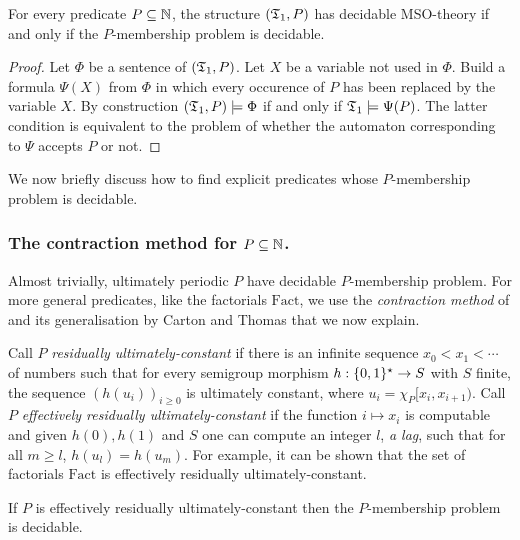 \begin{lemma} \cite{ElRa66}
For every predicate $P \subseteq \mathbb{N}$, the structure $(\mathfrak{T}_1,P)$ has decidable
MSO-theory if and only if the $P$-membership problem is decidable.
\end{lemma}

\begin{proof}
Let $\Phi$ be a sentence of $(\mathfrak{T}_1,P)$. Let $X$ be a
variable not used in $\Phi$.  Build a formula $\Psi(X)$ from $\Phi$ in which
every occurence of $P$ has been replaced by the variable $X$.  By construction
$(\mathfrak{T}_1,P) \models \Phi$ if and only if $\mathfrak{T}_1 \models \Psi(P)$.  The
latter condition is equivalent to the problem of whether the automaton
corresponding to $\Psi$ accepts $P$ or not.
\end{proof}

We now briefly discuss how to find explicit predicates whose $P$-membership problem is decidable.

\subsubsection*{The contraction method for $P \subseteq \mathbb{N}$.}
Almost trivially, ultimately periodic $P$ have decidable $P$-membership problem.
For more general predicates, like the factorials $\mathrm{Fact}$, we use the {\em contraction method} of \cite{ElRa66}
and its generalisation by Carton and Thomas \cite{CaTh02} that we now explain.

Call $P$  {\em residually ultimately-constant} if there is an infinite sequence $x_0 < x_1 < \cdots$ of numbers such that
for every semigroup morphism $h:\{0,1\}^\star \to S$ with $S$ finite, the sequence $(h(u_i))_{i \geq 0}$ is ultimately constant,
where $u_i = \chi_P[x_i,x_{i+1})$.
Call $P$ {\em effectively residually ultimately-constant} if the function $i \mapsto x_i$ is computable and given $h(0),h(1)$ and $S$ one can compute an integer $l$, {\em a lag}, such that for all $m \geq l$, $h(u_l) = h(u_m)$. For example, it can be shown that the set of factorials $\textrm{Fact}$ is effectively residually ultimately-constant.

\begin{proposition} \cite{CaTh02}
If $P$ is effectively residually ultimately-constant then the $P$-membership problem is decidable.
\end{proposition}

